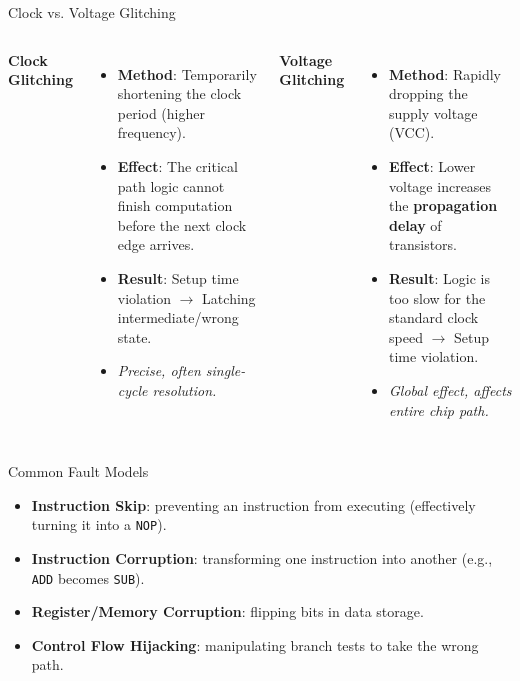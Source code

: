 \documentclass[aspectratio=169]{beamer}
\begin{document}
\begin{frame}{Clock vs. Voltage Glitching}
    \begin{columns}
        \textbf{Clock Glitching}
        \begin{itemize}
            \item \textbf{Method}: Temporarily shortening the clock period (higher frequency).
            \item \textbf{Effect}: The critical path logic cannot finish computation before the next clock edge arrives.
            \item \textbf{Result}: Setup time violation $\rightarrow$ Latching intermediate/wrong state.
            \item \textit{Precise, often single-cycle resolution.}
        \end{itemize}

        \textbf{Voltage Glitching}
        \begin{itemize}
            \item \textbf{Method}: Rapidly dropping the supply voltage (VCC).
            \item \textbf{Effect}: Lower voltage increases the \textbf{propagation delay} of transistors.
            \item \textbf{Result}: Logic is too slow for the standard clock speed $\rightarrow$ Setup time violation.
            \item \textit{Global effect, affects entire chip path.}
        \end{itemize}
    \end{columns}
\end{frame}

\begin{frame}{Common Fault Models}
    \begin{itemize}
        \item \textbf{Instruction Skip}: preventing an instruction from executing (effectively turning it into a \texttt{NOP}).
        \item \textbf{Instruction Corruption}: transforming one instruction into another (e.g., \texttt{ADD} becomes \texttt{SUB}).
        \item \textbf{Register/Memory Corruption}: flipping bits in data storage.
        \item \textbf{Control Flow Hijacking}: manipulating branch tests to take the wrong path.
    \end{itemize}
\end{frame}
\end{document}

